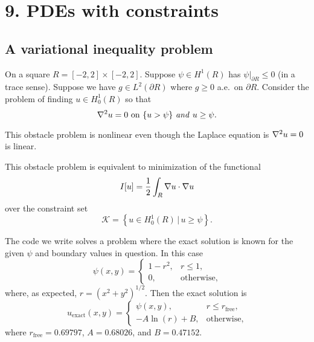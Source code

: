 
\chapter{9. PDEs with constraints}

\section{A variational inequality problem}

On a square $R = [-2,2]\times [-2,2]$.  Suppose $\psi \in H^1(R)$ has $\psi\big|_{\partial R} \le 0$ (in a trace sense).  Suppose we have $g\in L^2(\partial R)$ where $g \ge 0$ a.e.~on $\partial R$.  Consider the problem of finding $u\in H_0^1(R)$ so that
\begin{equation}
    \nabla^2 u = 0 \text{ on } \{u > \psi\} \text{ \emph{and} } u\ge \psi. \label{obstaclestrong}
\end{equation}

This obstacle problem is nonlinear even though the Laplace equation is $\nabla^2 u = 0$ is linear.

This obstacle problem is equivalent to minimization of the functional
\begin{equation}
I[u] = \frac{1}{2} \int_R \nabla u\cdot \nabla u
\end{equation}
over the constraint set
\begin{equation}
\mathcal{K} = \left\{u \in H_0^1(R) \,\Big|\, u\ge \psi\right\}.
\end{equation}

The code we write solves a problem where the exact solution is known for the given $\psi$ and boundary values in question.  In this case
   $$\psi(x,y) = \begin{cases} 1 - r^2, & r \le 1, \\  0, & \text{otherwise},\end{cases}$$
where, as expected, $r = (x^2+y^2)^{1/2}$.%
Then the exact solution is
   $$u_{\text{exact}}(x,y) = \begin{cases} \psi(x,y), & r \le r_{\text{free}}, \\  - A \ln(r) + B, & \text{otherwise},\end{cases}$$
where $r_{\text{free}} = 0.69797$, $A = 0.68026$, and $B = 0.47152$.




